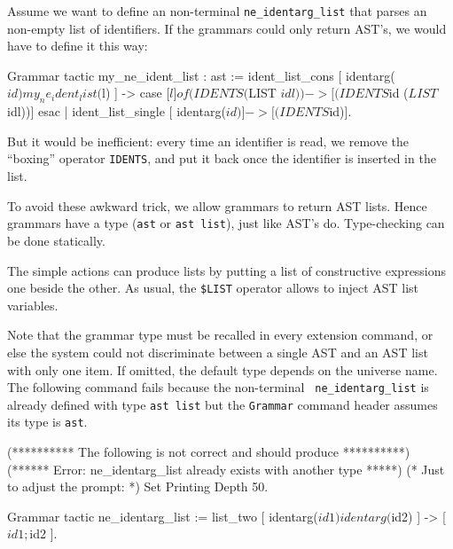 {Assume we want to define an non-terminal {\tt ne\_identarg\_list} that
parses an non-empty list of identifiers. If the grammars could only
return AST's, we would have to define it this way:

\begin{coq_example*}
Grammar tactic my_ne_ident_list : ast :=
  ident_list_cons [ identarg($id) my_ne_ident_list($l) ] ->
    case [$l] of
      (IDENTS ($LIST $idl)) -> [(IDENTS $id ($LIST $idl))]
    esac
| ident_list_single [ identarg($id) ] -> [(IDENTS $id)].
\end{coq_example*}

But it would be inefficient: every time an identifier is read, we
remove the ``boxing'' operator {\tt IDENTS}, and put it back once the
identifier is inserted in the list.

To avoid these awkward trick, we allow grammars to return AST
lists. Hence grammars have a type ({\tt ast} or {\tt ast list}), just like
AST's do. Type-checking can be done statically.

The simple actions can produce lists by putting a list of constructive
expressions one beside the other. As usual, the {\tt\$LIST} operator
allows to inject AST list variables.


Note that the grammar type must be recalled in every extension
command, or else the system could not discriminate between a single
AST and an AST list with only one item. If omitted, the default type
depends on the universe name. The following command fails because the non-terminal {\tt
ne\_identarg\_list} is already defined with type {\tt ast list} but the
{\tt Grammar} command header assumes its type is {\tt ast}.

\begin{coq_eval}
(********** The following is not correct and should produce **********)
(****** Error: ne_identarg_list already exists with another type *****)
(* Just to adjust the prompt: *) Set Printing Depth 50.
\end{coq_eval}
\begin{coq_example}           
Grammar tactic ne_identarg_list :=
  list_two [ identarg($id1) identarg($id2) ] -> [ $id1 ; $id2 ]. 
\end{coq_example}

}

